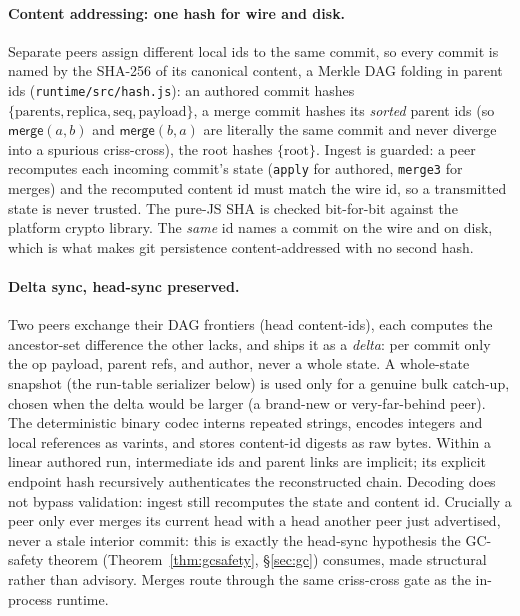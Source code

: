 \documentclass[11pt]{article}
\newcommand{\merge}{\mathsf{merge}}
\newcommand{\code}[1]{\texttt{#1}}
\begin{document}
\paragraph{Content addressing: one hash for wire and disk.} Separate
peers assign different local ids to the same commit, so every commit is
named by the SHA-256 of its canonical content, a Merkle DAG folding in
parent ids (\code{runtime/src/hash.js}): an authored commit hashes
$\{\text{parents}, \text{replica}, \text{seq}, \text{payload}\}$, a merge
commit hashes its \emph{sorted} parent ids (so $\merge(a,b)$ and
$\merge(b,a)$ are literally the same commit and never diverge into a
spurious criss-cross), the root hashes $\{\text{root}\}$. Ingest is
guarded: a peer recomputes each incoming commit's state
(\code{apply} for authored, \code{merge3} for merges) and the recomputed
content id must match the wire id, so a transmitted state is never trusted. The
pure-JS SHA is checked bit-for-bit against the platform crypto library.
The \emph{same} id names a commit on the wire and on disk, which is what
makes git persistence content-addressed with no second hash.

\paragraph{Delta sync, head-sync preserved.} Two peers exchange their DAG
frontiers (head content-ids), each computes the ancestor-set difference
the other lacks, and ships it as a \emph{delta}: per commit only the op
payload, parent refs, and author, never a whole state. A whole-state
snapshot (the run-table serializer below) is used only for a genuine bulk
catch-up, chosen when the delta would be larger (a brand-new or
very-far-behind peer). The deterministic binary codec interns repeated
strings, encodes integers and local references as varints, and stores content-id
digests as raw bytes. Within a linear authored run, intermediate ids and parent
links are implicit; its explicit endpoint hash recursively authenticates the
reconstructed chain. Decoding does not bypass validation: ingest still
recomputes the state and content id. Crucially a peer only ever merges its current head
with a head another peer just advertised, never a stale interior commit:
this is exactly the head-sync hypothesis the GC-safety theorem
(Theorem~\ref{thm:gcsafety}, \S\ref{sec:gc}) consumes, made structural
rather than advisory. Merges
route through the same criss-cross gate as the in-process runtime.
\end{document}
